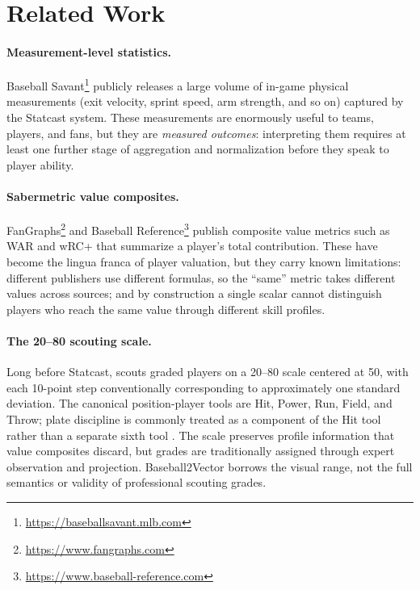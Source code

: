 \documentclass[10pt,twocolumn,letterpaper]{article}
\begin{document}
\section{Related Work}
\label{sec:related}

\paragraph{Measurement-level statistics.}
Baseball Savant\footnote{\url{https://baseballsavant.mlb.com}} publicly releases a large volume of in-game physical measurements (exit velocity, sprint speed, arm strength, and so on) captured by the Statcast system. These measurements are enormously useful to teams, players, and fans, but they are \emph{measured outcomes}: interpreting them requires at least one further stage of aggregation and normalization before they speak to player ability.

\paragraph{Sabermetric value composites.}
FanGraphs\footnote{\url{https://www.fangraphs.com}} and Baseball Reference\footnote{\url{https://www.baseball-reference.com}} publish composite value metrics such as WAR and wRC+ that summarize a player's total contribution. These have become the lingua franca of player valuation, but they carry known limitations: different publishers use different formulas, so the ``same'' metric takes different values across sources; and by construction a single scalar cannot distinguish players who reach the same value through different skill profiles.

\paragraph{The 20--80 scouting scale.}
Long before Statcast, scouts graded players on a 20--80 scale centered at 50, with each 10-point step conventionally corresponding to approximately one standard deviation. The canonical position-player tools are Hit, Power, Run, Field, and Throw; plate discipline is commonly treated as a component of the Hit tool rather than a separate sixth tool \cite{mcdaniel2014}. The scale preserves profile information that value composites discard, but grades are traditionally assigned through expert observation and projection. Baseball2Vector borrows the visual range, not the full semantics or validity of professional scouting grades.
\end{document}
